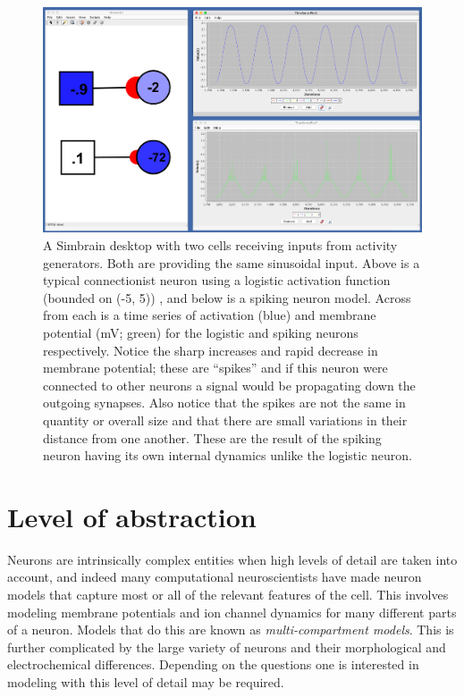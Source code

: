 \begin{figure}[h]
\centering
\includegraphics[width=\textwidth]{./images/SpikeNonSpikeTimeSeries.png}
\caption[Simbrain screenshot by Zo\"e Tosi]{A Simbrain desktop with two cells receiving inputs from activity generators. Both are providing the same sinusoidal input. Above is a typical connectionist neuron using a logistic activation function (bounded on (-5, 5)) , and below is a spiking neuron model. Across from each is a time series of activation (blue)  and membrane potential (mV; green) for the logistic and spiking neurons respectively. Notice the sharp increases and rapid decrease in membrane potential; these are ``spikes'' and if this neuron were connected to other neurons a signal would be propagating down the outgoing synapses. Also notice that the spikes are not the same in quantity or overall size and that there are small variations in their distance from one another. These are the result of the spiking neuron having its own internal dynamics unlike the logistic neuron.} 
\label{TSComp}
\end{figure}

\section{Level of abstraction}

Neurons are intrinsically complex entities when high levels of detail are taken into account, and indeed many computational neuroscientists have made neuron models that capture most or all of the relevant features of the cell. This involves modeling membrane potentials and ion channel dynamics for many different parts of a neuron. Models that do this are known as \emph{multi-compartment models}. This is further complicated by the large variety of neurons and their morphological and electrochemical differences. Depending on the questions one is interested in modeling with this level of detail may be required. 

